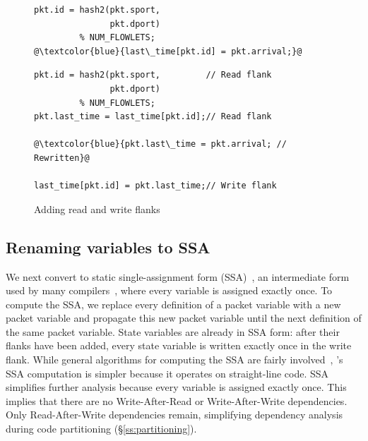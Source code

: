 \begin{figure}[!t]
  \begin{minipage}{0.43\textwidth}
  \begin{small}
  \begin{lstlisting}[style=customc]
pkt.id = hash2(pkt.sport,
               pkt.dport)
         % NUM_FLOWLETS;
@\textcolor{blue}{last\_time[pkt.id] = pkt.arrival;}@
  \end{lstlisting}
  \end{small}
  \end{minipage}
  \begin{minipage}{0.61\textwidth}
  \begin{small}
  \begin{lstlisting}[style=customc]
pkt.id = hash2(pkt.sport,         // Read flank
               pkt.dport)
         % NUM_FLOWLETS;
pkt.last_time = last_time[pkt.id];// Read flank

@\textcolor{blue}{pkt.last\_time = pkt.arrival; // Rewritten}@

last_time[pkt.id] = pkt.last_time;// Write flank
  \end{lstlisting}
  \end{small}
  \end{minipage}
  \caption{Adding read and write flanks}
\label{fig:stateful_flanks}
\end{figure}

\subsection{Renaming variables to SSA}
\label{ss:ssa}

We next convert to static single-assignment form (SSA)~\cite{ssa}, an
intermediate form used by many compilers~\cite{tree_ssa, llvm}, where every
variable is assigned exactly once. To compute the SSA, we replace every
definition of a packet variable with a new packet variable and propagate this
new packet variable until the next definition of the same packet variable.
State variables are already in SSA form: after their flanks have been added,
every state variable is written exactly once in the write flank.  While general
algorithms for computing the SSA are fairly involved~\cite{ssa}, \pktlanguage's
SSA computation is simpler because it operates on straight-line code.  SSA
simplifies further analysis because every variable is assigned exactly once.
This implies that there are no Write-After-Read or Write-After-Write
dependencies. Only Read-After-Write dependencies remain, simplifying dependency
analysis during code partitioning (\S\ref{ss:partitioning}).

